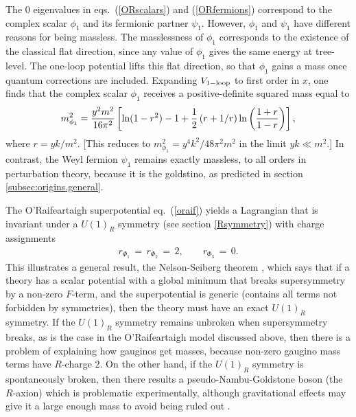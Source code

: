 \documentclass[11pt]{article}
\def\beq{\begin{eqnarray}}
\def\eeq{\end{eqnarray}}
\begin{document}
The 0 eigenvalues in eqs.~(\ref{ORscalars}) and
(\ref{ORfermions}) correspond to the complex scalar $\phi_1$ and its
fermionic partner $\psi_1$. However, $\phi_1$ and $\psi_1$ have different
reasons for being massless. The masslessness of $\phi_1$ corresponds to
the existence of the classical flat direction, since any value of $\phi_1$ gives the
same energy at tree-level. 
The one-loop potential 
lifts this flat direction, so that $\phi_1$ gains a 
mass once 
quantum corrections are included. Expanding $V_{\rm 1-loop}$ to first order in 
$x$, one finds that
the complex scalar $\phi_1$ receives a
positive-definite squared mass equal to
\beq
m_{\phi_1}^2 = {y^2 m^2\over 16 \pi^2} \left [
\ln (1 - r^2) - 1 + \frac{1}{2} \left ( r + 1/r \right )
\ln \left ( \frac{1 + r}{1-r} \right )
\right ],
\label{eq:ORmsq}
\eeq
where $r = y k/m^2$. [This reduces to $m_{\phi_1}^2 =
y^4 k^2/48 \pi^2 m^2$ in the limit $yk\ll m^2$.] 
In contrast, the Weyl
fermion $\psi_1$ remains exactly massless, to all orders in perturbation theory,
because it is the goldstino, as
predicted in section \ref{subsec:origins.general}.

The O'Rai\-f\-ear\-taigh superpotential eq.~(\ref{oraif}) yields a Lagrangian that 
is invariant under a
$U(1)_R$ symmetry (see section \ref{Rsymmetry}) with charge assignments
\beq
r_{\Phi_1} \,=\, r_{\Phi_2} \,=\, 2,\qquad
r_{\Phi_3} \,=\, 0.
\eeq
This illustrates a general result, the Nelson-Seiberg theorem \cite{Nelson:1993nf}, 
which says that
if a theory has a scalar potential with a global minimum that breaks supersymmetry by a non-zero 
$F$-term, and the superpotential is generic 
(contains all terms not forbidden by symmetries), 
then the theory must have an exact $U(1)_R$
symmetry. If the $U(1)_R$ symmetry remains unbroken when supersymmetry breaks, 
as is the case in the O'Rai\-f\-ear\-taigh model discussed above, then 
there is a 
problem of explaining how gauginos get masses, because non-zero gaugino mass
terms have $R$-charge 
$2$. On the other hand, if the $U(1)_R$ symmetry is spontaneously broken,
then there results a pseudo-Nambu-Goldstone boson (the $R$-axion) which is problematic
experimentally, although gravitational effects may give it a large enough mass to avoid being 
ruled out \cite{Raxion}. 
\end{document}
